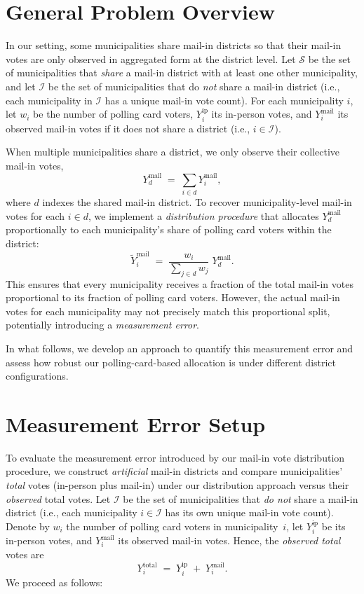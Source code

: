 \documentclass[12pt]{article}
\newcommand{\ip}{\text{ip}}
\newcommand{\mail}{\text{mail}}
\newcommand{\total}{\text{total}}
\begin{document}
\section{General Problem Overview}

In our setting, some municipalities share mail-in districts so that their mail-in votes are only observed in aggregated form at the district level. Let $\mathcal{S}$ be the set of municipalities that \emph{share} a mail-in district with at least one other municipality, and let $\mathcal{I}$ be the set of municipalities that do \emph{not} share a mail-in district (i.e., each municipality in $\mathcal{I}$ has a unique mail-in vote count). For each municipality $i$, let $w_i$ be the number of polling card voters, $Y_i^{\ip}$ its in-person votes, and $Y_i^{\mail}$ its observed mail-in votes if it does not share a district (i.e., $i \in \mathcal{I}$). 

When multiple municipalities share a district, we only observe their collective mail-in votes,
\[
    Y_d^{\mail} \;=\; \sum_{i \in d} Y_i^{\mail},
\]
where $d$ indexes the shared mail-in district. To recover municipality-level mail-in votes for each $i \in d$, we implement a \emph{distribution procedure} that allocates $Y_d^{\mail}$ proportionally to each municipality's share of polling card voters within the district:
\[
    \widetilde{Y}_i^{\mail}
    \;=\;
    \frac{w_i}{\sum_{j \in d} w_j}
    \; Y_d^{\mail}.
\]
This ensures that every municipality receives a fraction of the total mail-in votes proportional to its fraction of polling card voters. However, the actual mail-in votes for each municipality may not precisely match this proportional split, potentially introducing a \emph{measurement error}. 

In what follows, we develop an approach to quantify this measurement error and assess how robust our polling-card-based allocation is under different district configurations.

\section{Measurement Error Setup}

To evaluate the measurement error introduced by our mail-in vote distribution procedure, we construct \emph{artificial} mail-in districts and compare municipalities’ \emph{total} votes (in-person plus mail-in) under our distribution approach versus their \emph{observed} total votes. Let $\mathcal{I}$ be the set of municipalities that \emph{do not} share a mail-in district (i.e., each municipality $i \in \mathcal{I}$ has its own unique mail-in vote count). Denote by $w_i$ the number of polling card voters in municipality~$i$, let $Y_i^{\ip}$ be its in-person votes, and $Y_i^{\mail}$ its observed mail-in votes. Hence, the \emph{observed total} votes are 
\[
    Y_i^{\total} \;=\; Y_i^{\ip} \;+\; Y_i^{\mail}.
\]
We proceed as follows:
\end{document}
